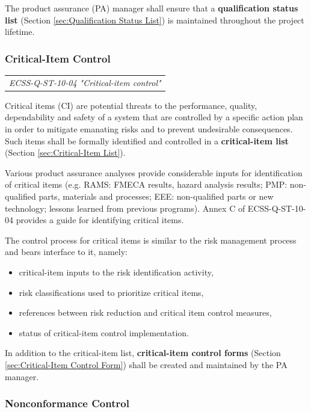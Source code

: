 The product assurance (PA) manager shall ensure that a \textbf{qualification status list} (Section \ref{sec:Qualification Status List}) is maintained throughout the project lifetime.

\subsubsection{Critical-Item Control}
\label{sec:Critical-Item Control}

\begin{tabular}{l}
\textit{ECSS-Q-ST-10-04 "Critical-item control" \cite{ECSS-Q-ST-10-04}}
\end{tabular}

Critical items (CI) are potential threats to the performance, quality, dependability and safety of a system that are controlled by a specific action plan in order to mitigate emanating risks and to prevent undesirable consequences. Such items shall be formally identified and controlled in a \textbf{critical-item list} (Section \ref{sec:Critical-Item List}). 

Various product assurance analyses provide considerable inputs for identification of critical items (e.g. RAMS: FMECA results, hazard analysis results; PMP: non-qualified parts, materials and processes; EEE: non-qualified parts or new technology; lessons learned from previous programs). Annex C of ECSS-Q-ST-10-04 provides a guide for identifying critical items.

The control process for critical items is similar to the risk management process and bears interface to it, namely:

\begin{itemize}
\item critical-item inputs to the risk identification activity, 
\item risk classifications used to prioritize critical items, 
\item references between risk reduction and critical item control measures, 
\item status of critical-item control implementation. 
\end{itemize}

In addition to the critical-item list, \textbf{critical-item control forms} (Section \ref{sec:Critical-Item Control Form}) shall be created and maintained by the PA manager.

\subsubsection{Nonconformance Control}
\label{sec:Nonconformance Control}

